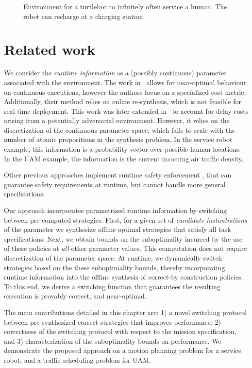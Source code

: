 \begin{figure}
     \centering
    
    \caption{Environment for a turtlebot to infinitely often service a human. The robot can recharge at a charging station.}
    \label{fig:gazeboworld}
\end{figure}

\section{Related work}

We consider the \emph{runtime information} as a (possibly continuous) parameter associated with the environment. The work in~\cite{jangcontinuous} allows for near-optimal behaviour on continuous executions, however the authors focus on a specialized cost metric. Additionally, their method relies on online re-synthesis, which is not feasible for real-time deployment. This work was later extended in~\cite{Ehlerscost} to account for delay costs arising from a potentially adversarial environment. However, it relies on the discretization of the continuous parameter space, which fails to scale with the number of atomic propositions in the synthesis problem. 
In the service robot example, this information is a probability vector over possible human locations. In the UAM example, the information is the current incoming air traffic density.  

Other previous approaches implement runtime safety enforcement \cite{AlshiekhShield,Konighofer2017,8815233}, that can guarantee safety requirements at runtime, but cannot handle more general specifications.

Our approach incorporates parametrized runtime information by switching between pre-computed strategies. First, for a given set of \emph{candidate instantiations} of the parameter we synthesize offline optimal strategies that satisfy all task specifications. Next, we obtain bounds on the suboptimality incurred by the use of these policies at \emph{all} other parameter values. This computation does not require discretization of the parameter space. At runtime, we dynamically switch strategies based on the these suboptimality bounds, thereby incorporating runtime information into the offline synthesis of correct-by construction policies. 
To this end, we derive a switching function that guarantees the resulting execution is provably correct, and near-optimal.

The main contributions detailed in this chapter are: 1) a novel switching protocol between pre-synthesized correct strategies that improves performance, 2) correctness of the switching protocol with respect to the mission specification, and 3) characterization of the suboptimality bounds on performance. We demonstrate the proposed approach on a motion planning problem for a service robot, and a traffic scheduling problem for UAM. 

